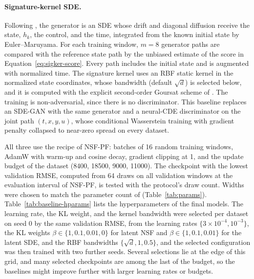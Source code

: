 \paragraph{Signature-kernel SDE.} Following \citet{issa2023sigkernel}, the generator is an SDE whose drift and diagonal diffusion receive the state, $h_k$, the control, and the time, integrated from the known initial state by Euler--Maruyama. For each training window, $m=8$ generator paths are compared with the reference state path by the unbiased estimate of the score in Equation~\eqref{eq:sigker-score}. Every path includes the initial state and is augmented with normalized time. The signature kernel uses an RBF static kernel in the normalized state coordinates, whose bandwidth (default $\sqrt d$) is selected below, and it is computed with the explicit second-order Goursat scheme of \citet{salvi2021goursat}. The training is non-adversarial, since there is no discriminator. This baseline replaces an SDE-GAN \citep{kidger2021gan} with the same generator and a neural-CDE discriminator on the joint path $(t,x,y,u)$, whose conditional Wasserstein training with gradient penalty collapsed to near-zero spread on every dataset.

All three use the recipe of NSF-PF: batches of 16 random training windows, AdamW with warm-up and cosine decay, gradient clipping at 1, and the update budget of the dataset (8400, 18500, 9000, 11000). The checkpoint with the lowest validation RMSE, computed from 64 draws on all validation windows at the evaluation interval of NSF-PF, is tested with the protocol's draw count. Widths were chosen to match the parameter count of \method (Table~\ref{tab:params}). Table~\ref{tab:baseline-hparams} lists the hyperparameters of the final models. The learning rate, the KL weight, and the kernel bandwidth were selected per dataset on seed 0 by the same validation RMSE, from the learning rates $\{3\times10^{-4},10^{-3}\}$, the KL weights $\beta\in\{1,0.1,0.01,0\}$ for latent NSF and $\beta\in\{1,0.1,0.01\}$ for the latent SDE, and the RBF bandwidths $\{\sqrt d,1,0.5\}$, and the selected configuration was then trained with two further seeds. Several selections lie at the edge of this grid, and many selected checkpoints are among the last of the budget, so the baselines might improve further with larger learning rates or budgets.

